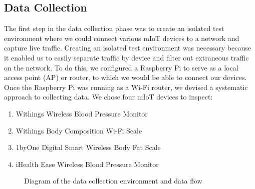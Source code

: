 \subsection{Data Collection}

The first step in the data collection phase was to create an isolated test environment where we could connect various mIoT devices to a network and capture live traffic. Creating an isolated test environment was necessary because it enabled us to easily separate traffic by device and filter out extraneous traffic on the network. To do this, we configured a Raspberry Pi to serve as a local access point (AP) or router, to which we would be able to connect our devices. Once the Raspberry Pi was running as a Wi-Fi router, we devised a systematic approach to collecting data. We chose four mIoT devices to inspect:

\begin{enumerate}
  \item Withings Wireless Blood Pressure Monitor
  \item Withings Body Composition Wi-Fi Scale
  \item 1byOne Digital Smart Wireless Body Fat Scale
  \item iHealth Ease Wireless Blood Pressure Monitor
\end{enumerate}

\begin{figure}
  \caption{Diagram of the data collection environment and data flow}
  \centering
\end{figure}

